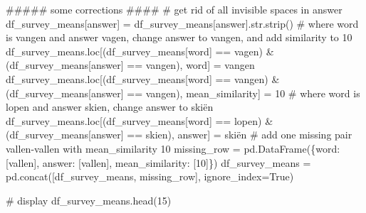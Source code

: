 \documentclass[
  letterpaper,
  DIV=11,
  numbers=noendperiod]{scrreprt}
\newenvironment{Shaded}{\begin{snugshade}}{\end{snugshade}}
\newcommand{\BuiltInTok}[1]{\textcolor[rgb]{0.00,0.23,0.31}{#1}}
\newcommand{\CommentTok}[1]{\textcolor[rgb]{0.37,0.37,0.37}{#1}}
\newcommand{\DecValTok}[1]{\textcolor[rgb]{0.68,0.00,0.00}{#1}}
\newcommand{\NormalTok}[1]{\textcolor[rgb]{0.00,0.23,0.31}{#1}}
\newcommand{\OperatorTok}[1]{\textcolor[rgb]{0.37,0.37,0.37}{#1}}
\newcommand{\StringTok}[1]{\textcolor[rgb]{0.13,0.47,0.30}{#1}}
\newcommand{\VariableTok}[1]{\textcolor[rgb]{0.07,0.07,0.07}{#1}}
\begin{document}
\begin{Shaded}
\begin{Highlighting}[]
\CommentTok{\#\#\#\#\# some corrections \#\#\#\#}
\CommentTok{\# get rid of all invisible spaces in answer}
\NormalTok{df\_survey\_means[}\StringTok{\textquotesingle{}answer\textquotesingle{}}\NormalTok{] }\OperatorTok{=}\NormalTok{ df\_survey\_means[}\StringTok{\textquotesingle{}answer\textquotesingle{}}\NormalTok{].}\BuiltInTok{str}\NormalTok{.strip()}
\CommentTok{\# where word is vangen and answer vagen, change answer to vangen, and add similarity to 10}
\NormalTok{df\_survey\_means.loc[(df\_survey\_means[}\StringTok{\textquotesingle{}word\textquotesingle{}}\NormalTok{] }\OperatorTok{==} \StringTok{\textquotesingle{}vagen\textquotesingle{}}\NormalTok{) }\OperatorTok{\&}\NormalTok{ (df\_survey\_means[}\StringTok{\textquotesingle{}answer\textquotesingle{}}\NormalTok{] }\OperatorTok{==} \StringTok{\textquotesingle{}vangen\textquotesingle{}}\NormalTok{), }\StringTok{\textquotesingle{}word\textquotesingle{}}\NormalTok{] }\OperatorTok{=} \StringTok{\textquotesingle{}vangen\textquotesingle{}}
\NormalTok{df\_survey\_means.loc[(df\_survey\_means[}\StringTok{\textquotesingle{}word\textquotesingle{}}\NormalTok{] }\OperatorTok{==} \StringTok{\textquotesingle{}vangen\textquotesingle{}}\NormalTok{) }\OperatorTok{\&}\NormalTok{ (df\_survey\_means[}\StringTok{\textquotesingle{}answer\textquotesingle{}}\NormalTok{] }\OperatorTok{==} \StringTok{\textquotesingle{}vangen\textquotesingle{}}\NormalTok{), }\StringTok{\textquotesingle{}mean\_similarity\textquotesingle{}}\NormalTok{] }\OperatorTok{=} \DecValTok{10}
\CommentTok{\# where word is lopen and answer skien, change answer to skiën}
\NormalTok{df\_survey\_means.loc[(df\_survey\_means[}\StringTok{\textquotesingle{}word\textquotesingle{}}\NormalTok{] }\OperatorTok{==} \StringTok{\textquotesingle{}lopen\textquotesingle{}}\NormalTok{) }\OperatorTok{\&}\NormalTok{ (df\_survey\_means[}\StringTok{\textquotesingle{}answer\textquotesingle{}}\NormalTok{] }\OperatorTok{==} \StringTok{\textquotesingle{}skien\textquotesingle{}}\NormalTok{), }\StringTok{\textquotesingle{}answer\textquotesingle{}}\NormalTok{] }\OperatorTok{=} \StringTok{\textquotesingle{}skiën\textquotesingle{}}
\CommentTok{\# add one missing pair vallen{-}vallen with mean\_similarity 10}
\NormalTok{missing\_row }\OperatorTok{=}\NormalTok{ pd.DataFrame(\{}\StringTok{\textquotesingle{}word\textquotesingle{}}\NormalTok{: [}\StringTok{\textquotesingle{}vallen\textquotesingle{}}\NormalTok{], }\StringTok{\textquotesingle{}answer\textquotesingle{}}\NormalTok{: [}\StringTok{\textquotesingle{}vallen\textquotesingle{}}\NormalTok{], }\StringTok{\textquotesingle{}mean\_similarity\textquotesingle{}}\NormalTok{: [}\DecValTok{10}\NormalTok{]\})}
\NormalTok{df\_survey\_means }\OperatorTok{=}\NormalTok{ pd.concat([df\_survey\_means, missing\_row], ignore\_index}\OperatorTok{=}\VariableTok{True}\NormalTok{)}

\CommentTok{\# display}
\NormalTok{df\_survey\_means.head(}\DecValTok{15}\NormalTok{)}
\end{Highlighting}
\end{Shaded}
\end{document}
